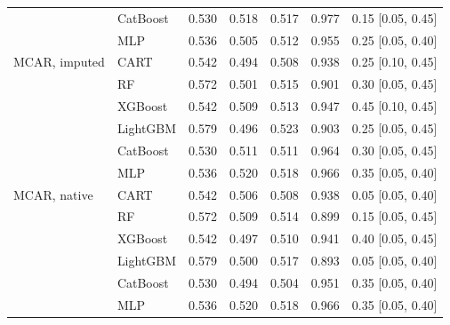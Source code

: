 \documentclass[pdflatex,sn-mathphys]{sn-jnl}
\theoremstyle{thmstyleone}
\begin{document}
\begin{table}[htbp]
\begin{tabular}{@{}llrrrrl@{}}
 & CatBoost & 0.530 & 0.518 & 0.517 & 0.977 & 0.15 [0.05, 0.45] \\
 & MLP & 0.536 & 0.505 & 0.512 & 0.955 & 0.25 [0.05, 0.40] \\
\midrule
MCAR, imputed & CART & 0.542 & 0.494 & 0.508 & 0.938 & 0.25 [0.10, 0.45] \\
 & RF & 0.572 & 0.501 & 0.515 & 0.901 & 0.30 [0.05, 0.45] \\
 & XGBoost & 0.542 & 0.509 & 0.513 & 0.947 & 0.45 [0.10, 0.45] \\
 & LightGBM & 0.579 & 0.496 & 0.523 & 0.903 & 0.25 [0.05, 0.45] \\
 & CatBoost & 0.530 & 0.511 & 0.511 & 0.964 & 0.30 [0.05, 0.45] \\
 & MLP & 0.536 & 0.520 & 0.518 & 0.966 & 0.35 [0.05, 0.40] \\
\midrule
MCAR, native & CART & 0.542 & 0.506 & 0.508 & 0.938 & 0.05 [0.05, 0.40] \\
 & RF & 0.572 & 0.509 & 0.514 & 0.899 & 0.15 [0.05, 0.45] \\
 & XGBoost & 0.542 & 0.497 & 0.510 & 0.941 & 0.40 [0.05, 0.45] \\
 & LightGBM & 0.579 & 0.500 & 0.517 & 0.893 & 0.05 [0.05, 0.40] \\
 & CatBoost & 0.530 & 0.494 & 0.504 & 0.951 & 0.35 [0.05, 0.40] \\
 & MLP & 0.536 & 0.520 & 0.518 & 0.966 & 0.35 [0.05, 0.40] \\
\bottomrule
\end{tabular}
\end{table}
\end{document}
